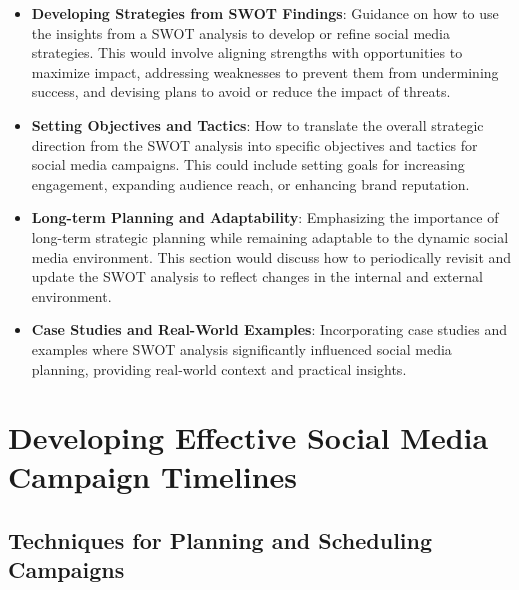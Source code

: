 \documentclass[
]{book}
\providecommand{\tightlist}{%
  \setlength{\itemsep}{0pt}\setlength{\parskip}{0pt}}
\begin{document}
\begin{itemize}
\tightlist
\item
  \textbf{Developing Strategies from SWOT Findings}: Guidance on how to use the insights from a SWOT analysis to develop or refine social media strategies. This would involve aligning strengths with opportunities to maximize impact, addressing weaknesses to prevent them from undermining success, and devising plans to avoid or reduce the impact of threats.
\item
  \textbf{Setting Objectives and Tactics}: How to translate the overall strategic direction from the SWOT analysis into specific objectives and tactics for social media campaigns. This could include setting goals for increasing engagement, expanding audience reach, or enhancing brand reputation.
\item
  \textbf{Long-term Planning and Adaptability}: Emphasizing the importance of long-term strategic planning while remaining adaptable to the dynamic social media environment. This section would discuss how to periodically revisit and update the SWOT analysis to reflect changes in the internal and external environment.
\item
  \textbf{Case Studies and Real-World Examples}: Incorporating case studies and examples where SWOT analysis significantly influenced social media planning, providing real-world context and practical insights.
\end{itemize}

\hypertarget{developing-effective-social-media-campaign-timelines}{%
\chapter{Developing Effective Social Media Campaign Timelines}\label{developing-effective-social-media-campaign-timelines}}

\hypertarget{techniques-for-planning-and-scheduling-campaigns}{%
\section*{Techniques for Planning and Scheduling Campaigns}\label{techniques-for-planning-and-scheduling-campaigns}}
\end{document}
